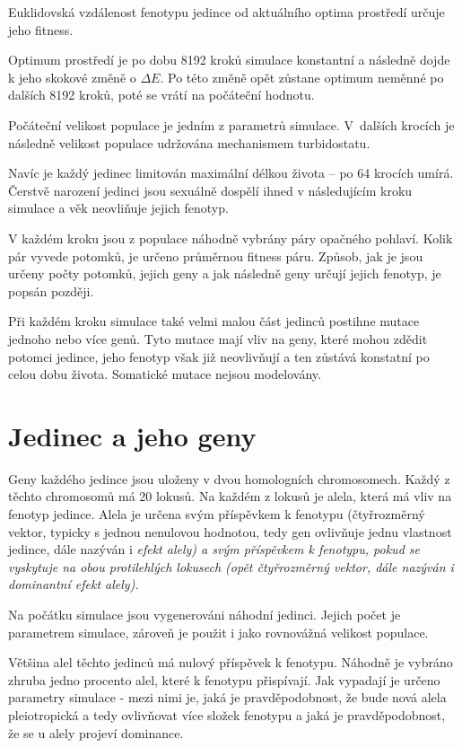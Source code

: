 Euklidovská vzdálenost fenotypu jedince od aktuálního optima prostředí určuje jeho fitness.

Optimum prostředí je po dobu 8192 kroků simulace konstantní a následně dojde k jeho skokové změně o
$\Delta{}E$. Po této změně opět zůstane optimum neměnné po dalších 8192 kroků, poté se vrátí na počáteční hodnotu.

Počáteční velikost populace je jedním z parametrů simulace. V~dalších krocích je následně velikost populace udržována
mechanismem turbidostatu.

Navíc je každý jedinec limitován maximální délkou života -- po 64 krocích umírá.
Čerstvě narození jedinci jsou sexuálně dospělí ihned v následujícím kroku simulace a věk neovliňuje jejich fenotyp.

V každém kroku jsou z populace náhodně vybrány páry opačného pohlaví.
Kolik pár vyvede potomků, je určeno průměrnou fitness páru. Způsob, jak je jsou určeny počty potomků, jejich geny a
jak následně geny určují jejich fenotyp, je popsán později.

Při každém kroku simulace také velmi malou část jedinců postihne mutace jednoho nebo více genů. Tyto mutace mají
vliv na geny, které mohou zdědit potomci jedince, jeho fenotyp však již neovlivňují a ten zůstává konstatní po celou
dobu života. Somatické mutace nejsou modelovány.

\section{Jedinec a jeho geny}

Geny každého jedince jsou uloženy v dvou homologních chromosomech. Každý z těchto chromosomů má 20 lokusů.
Na každém z lokusů je alela, která má vliv na fenotyp jedince. Alela je určena svým příspěvkem k fenotypu (čtyřrozměrný
vektor, typicky s jednou nenulovou hodnotou, tedy gen ovlivňuje jednu vlastnost jedince, dále nazýván i
\em{efekt alely}) a svým příspěvkem k fenotypu, pokud se vyskytuje na obou protilehlých lokusech
(opět čtyřrozměrný vektor, dále nazýván i \em{dominantní efekt alely}).

Na počátku simulace jsou vygenerováni náhodní jedinci. Jejich počet je parametrem simulace, zároveň je použit i jako
rovnovážná velikost populace.

Většina alel těchto jedinců má nulový příspěvek k fenotypu. Náhodně je vybráno zhruba jedno procento alel, které k
fenotypu přispívají. Jak vypadají je určeno parametry simulace - mezi nimi je, jaká je pravděpodobnost, že bude
nová alela pleiotropická a tedy ovlivňovat více složek fenotypu a jaká je pravděpodobnost,
že se u alely projeví dominance.

